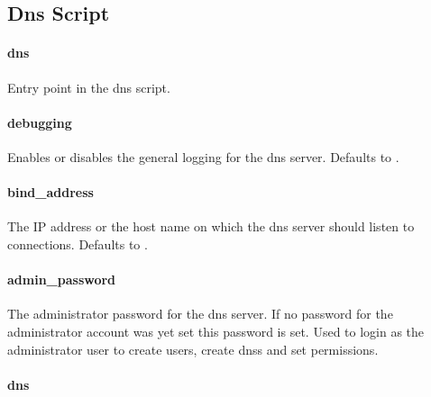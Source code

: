 \subsection{Dns Script}

\paragraph{dns}


Entry point in the dns script.

\paragraph{debugging}


Enables or disables the general logging for the dns server.
Defaults to \literalfalse.

\paragraph{bind\_address}


The IP address or the host name on which the dns server should listen
to connections. Defaults to .

\paragraph{admin\_password}


The administrator password for the dns server. If no password for
the administrator account was yet set this password is set. Used to login as
the administrator user to create users, create dnss and set permissions.

\paragraph{dns}

\\
\\
\\

